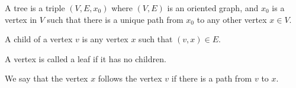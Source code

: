 \begin{definition}
    A tree is a triple $(V,E,x_0)$ where $(V,E)$ is an oriented graph, and $x_0$ is a vertex in $V$ such that there is a unique path from $x_0$ to any other vertex $x \in V$. 
\end{definition}
\begin{definition}
    A child of a vertex $v$ is any vertex $x$ such that $(v,x) \in E$. 
\end{definition}
\begin{definition}
    A vertex is called a leaf if it has no children. 
\end{definition}
We say that the vertex $x$ follows the vertex $v$ if there is a path from $v$ to $x$.